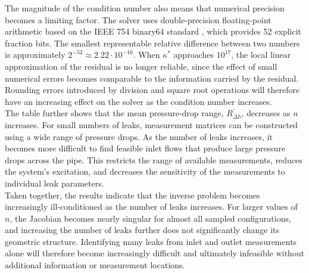 The magnitude of the condition number also means that numerical precision becomes a limiting factor. The solver uses double-precision floating-point arithmetic based on the IEEE 754 binary64 standard \cite{ieeefloat}, which provides 52 explicit fraction bits. The smallest representable relative difference between two numbers is approximately $2^{-52} \approx 2.22 \cdot 10^{-16}$. When $\kappa^*$ approaches $10^{17}$, the local linear approximation of the residual is no longer reliable, since the effect of small numerical errors becomes comparable to the information carried by the residual. Rounding errors introduced by division and square root operations will therefore have an increasing effect on the solver as the condition number increases.\\

The table further shows that the mean pressure-drop range, $\overline{R_{\Delta h}}$, decreases as $n$ increases. For small numbers of leaks, measurement matrices can be constructed using a wide range of pressure drops. As the number of leaks increases, it becomes more difficult to find feasible inlet flows that produce large pressure drops across the pipe. This restricts the range of available measurements, reduces the system's excitation, and decreases the sensitivity of the measurements to individual leak parameters.\\

Taken together, the results indicate that the inverse problem becomes increasingly ill-conditioned as the number of leaks increases. For larger values of $n$, the Jacobian becomes nearly singular for almost all sampled configurations, and increasing the number of leaks further does not significantly change its geometric structure. Identifying many leaks from inlet and outlet measurements alone will therefore become increasingly difficult and ultimately infeasible without additional information or measurement locations.
